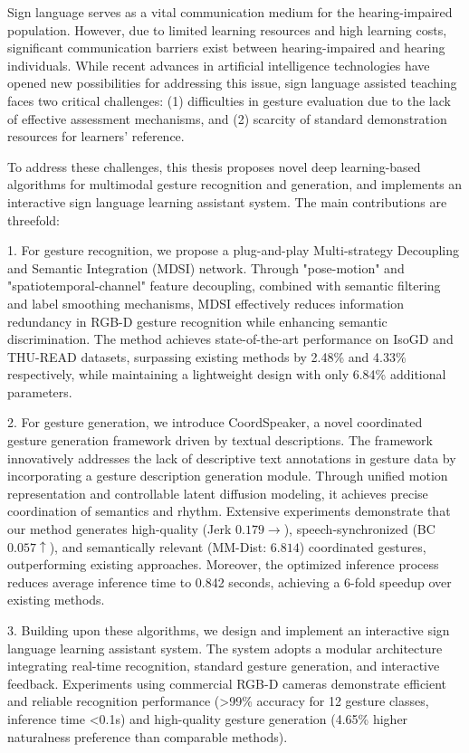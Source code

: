 \begin{abstract*}
Sign language serves as a vital communication medium for the hearing-impaired population. However, due to limited learning resources and high learning costs, significant communication barriers exist between hearing-impaired and hearing individuals. While recent advances in artificial intelligence technologies have opened new possibilities for addressing this issue, sign language assisted teaching faces two critical challenges: (1) difficulties in gesture evaluation due to the lack of effective assessment mechanisms, and (2) scarcity of standard demonstration resources for learners' reference.

To address these challenges, this thesis proposes novel deep learning-based algorithms for multimodal gesture recognition and generation, and implements an interactive sign language learning assistant system. The main contributions are threefold:

1. For gesture recognition, we propose a plug-and-play Multi-strategy Decoupling and Semantic Integration (MDSI) network. Through "pose-motion" and "spatiotemporal-channel" feature decoupling, combined with semantic filtering and label smoothing mechanisms, MDSI effectively reduces information redundancy in RGB-D gesture recognition while enhancing semantic discrimination. The method achieves state-of-the-art performance on IsoGD and THU-READ datasets, surpassing existing methods by 2.48\% and 4.33\% respectively, while maintaining a lightweight design with only 6.84\% additional parameters.

2. For gesture generation, we introduce CoordSpeaker, a novel coordinated gesture generation framework driven by textual descriptions. The framework innovatively addresses the lack of descriptive text annotations in gesture data by incorporating a gesture description generation module. Through unified motion representation and controllable latent diffusion modeling, it achieves precise coordination of semantics and rhythm. Extensive experiments demonstrate that our method generates high-quality (Jerk $0.179\rightarrow$), speech-synchronized (BC $0.057\uparrow$), and semantically relevant (MM-Dist: $6.814$) coordinated gestures, outperforming existing approaches. Moreover, the optimized inference process reduces average inference time to 0.842 seconds, achieving a 6-fold speedup over existing methods.

3. Building upon these algorithms, we design and implement an interactive sign language learning assistant system. The system adopts a modular architecture integrating real-time recognition, standard gesture generation, and interactive feedback. Experiments using commercial RGB-D cameras demonstrate efficient and reliable recognition performance (>99\% accuracy for 12 gesture classes, inference time <0.1s) and high-quality gesture generation (4.65\% higher naturalness preference than comparable methods). 


\end{abstract*}
